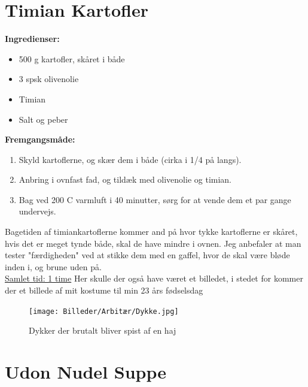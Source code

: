 \documentclass{book}
\begin{document}
\newpage \section{Timian Kartofler}
\begin{minipage}[t]{0.5\textwidth}
\textbf{Ingredienser:}
\begin{itemize}
    \item 500 g kartofler, skåret i både
    \item 3 spsk olivenolie
    \item Timian
    \item Salt og peber
    \end{itemize}
\end{minipage}
\begin{minipage}[t]{0.5\textwidth}
\textbf{Fremgangsmåde:}
\begin{enumerate}
    \item Skyld kartoflerne, og skær dem i både (cirka i 1/4 på langs).
    \item Anbring i ovnfast fad, og tildæk med olivenolie og timian.
    \item Bag ved 200 \degree C varmluft i 40 minutter, sørg for at vende dem et par gange undervejs.
\end{enumerate}
\end{minipage}
Bagetiden af timiankartoflerne kommer and på hvor tykke kartoflerne er skåret, hvis det er meget tynde både, skal de have mindre i ovnen. Jeg anbefaler at man tester "færdigheden" ved at stikke dem med en gaffel, hvor de skal være bløde inden i, og brune uden på.
\\
\underline{Samlet tid: 1 time}
\newpage Her skulle der også have været et billedet, i stedet for kommer der et billede af mit kostume til min 23 års fødselsdag 
\begin{figure}
    \centering
    \texttt{[image: Billeder/Arbitær/Dykke.jpg]}
    \caption{Dykker der brutalt bliver spist af en haj}   
\end{figure}
\newpage \section{Udon Nudel Suppe}
\end{document}
